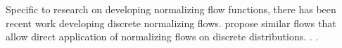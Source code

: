 Specific to research on developing normalizing flow functions, there has been recent work developing discrete normalizing flows. \cite{tran2019discreteflows,hoogeboom2019IntegerDiscreteFlows} propose similar flows that allow direct application of normalizing flows on discrete distributions. . .







